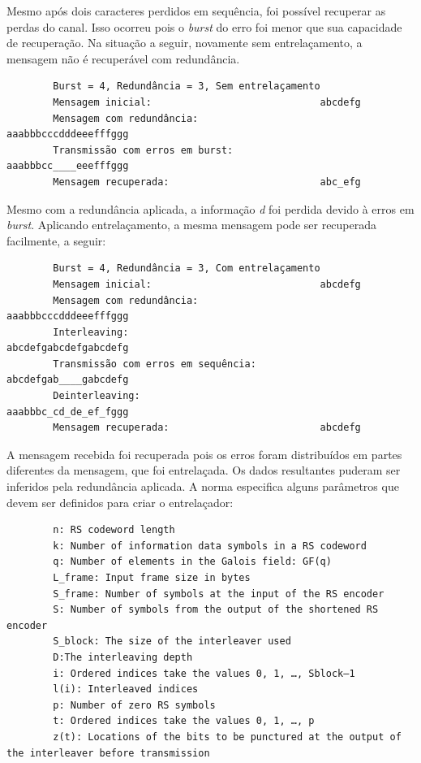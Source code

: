 	Mesmo após dois caracteres perdidos em sequência, foi possível recuperar as perdas do canal. Isso ocorreu pois o \textit{burst} do erro foi menor que sua capacidade de recuperação. Na situação a seguir, novamente sem entrelaçamento, a mensagem não é recuperável com redundância.
	
	\begin{verbatim}
	    Burst = 4, Redundância = 3, Sem entrelaçamento
	    Mensagem inicial:                             abcdefg
	    Mensagem com redundância:                     aaabbbcccdddeeefffggg
	    Transmissão com erros em burst:               aaabbbcc____eeefffggg
	    Mensagem recuperada:                          abc_efg
	\end{verbatim}
	
	Mesmo com a redundância aplicada, a informação \textit{d} foi perdida devido à erros em \textit{burst}. Aplicando entrelaçamento, a mesma mensagem pode ser recuperada facilmente, a seguir:
	
	\begin{verbatim}
	    Burst = 4, Redundância = 3, Com entrelaçamento
	    Mensagem inicial:                             abcdefg
	    Mensagem com redundância:                     aaabbbcccdddeeefffggg
	    Interleaving:                                 abcdefgabcdefgabcdefg
	    Transmissão com erros em sequência:           abcdefgab____gabcdefg
	    Deinterleaving:                               aaabbbc_cd_de_ef_fggg
	    Mensagem recuperada:                          abcdefg
	\end{verbatim}
	
	A mensagem recebida foi recuperada pois os erros foram distribuídos em partes diferentes da mensagem, que foi entrelaçada. Os dados resultantes puderam ser inferidos pela redundância aplicada. A norma especifica alguns parâmetros que devem ser definidos para criar o entrelaçador:
	
	\begin{verbatim}
	    n: RS codeword length
	    k: Number of information data symbols in a RS codeword
	    q: Number of elements in the Galois field: GF(q)
	    L_frame: Input frame size in bytes
	    S_frame: Number of symbols at the input of the RS encoder
	    S: Number of symbols from the output of the shortened RS encoder
	    S_block: The size of the interleaver used
	    D:The interleaving depth
	    i: Ordered indices take the values 0, 1, …, Sblock–1
	    l(i): Interleaved indices
	    p: Number of zero RS symbols
	    t: Ordered indices take the values 0, 1, …, p
	    z(t): Locations of the bits to be punctured at the output of the interleaver before transmission 
	\end{verbatim}
	
